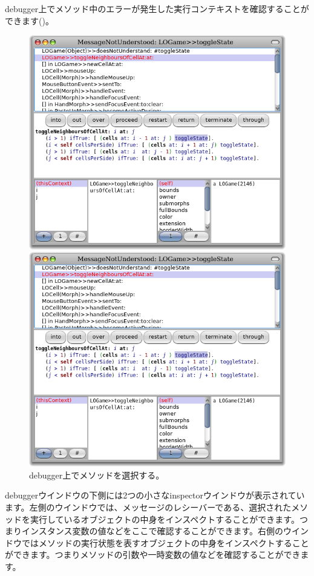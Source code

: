 \documentclass[a4paper,10pt,twoside]{book}
\begin{document}
debugger上でメソッド中のエラーが発生した実行コンテキストを確認することができます()。

\begin{figure}[ht]
\ifluluelse
	{\centerline {\includegraphics[width=\textwidth]{Debugger}}}
	{\centerline {\includegraphics[scale=0.7]{Debugger}}}
\caption{debugger上でメソッドを選択する。
}
\end{figure}

debuggerウインドウの下側には2つの小さなinspectorウインドウが表示されています。左側のウインドウでは、メッセージのレシーバーである、選択されたメソッドを実行しているオブジェクトの中身をインスペクトすることができます。つまりインスタンス変数の値などをここで確認することができます。右側のウインドウではメソッドの実行状態を表すオブジェクトの中身をインスペクトすることができます。つまりメソッドの引数や一時変数の値などを確認することができます。
\end{document}
